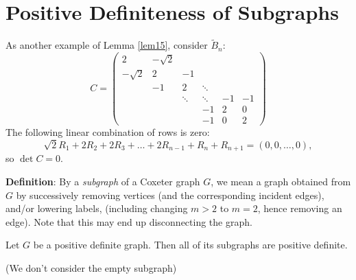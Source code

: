 \section{Positive Definiteness of Subgraphs}

As another example of Lemma \ref{lem15}, consider $\widetilde{B}_n$:
\[
    C = \begin{pmatrix}
        2 & -\sqrt{2} &  & \\
        -\sqrt{2} & 2 & -1 & \\
         & -1 & 2 & \ddots & \\
         & & \ddots & \ddots & -1 & -1 \\
         & & & -1 & 2 & 0 \\
         & & & -1 & 0 & 2
    \end{pmatrix}
\]
The following linear combination of rows is zero:
\[
    \sqrt{2} R_1 + 2 R_2 + 2 R_3 + \dots + 2 R_{n-1} + R_n + R_{n+1} = (0, 0, \dots, 0),
\]
so $\det C = 0$.

{\bf Definition}: By a {\em subgraph} of a Coxeter graph $G$, we mean a graph
obtained from $G$ by successively removing vertices (and the corresponding
incident edges), and/or lowering labels, (including changing $m>2$ to $m=2$,
hence removing an edge). Note that this may end up disconnecting the graph.

\begin{proposition} \label{prop16}
Let $G$ be a positive definite graph. Then all of its subgraphs are positive
definite.
\end{proposition}

(We don't consider the empty subgraph)

